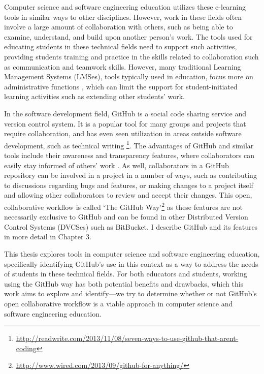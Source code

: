 Computer science and software engineering education utilizes these e-learning tools in similar ways to other disciplines. However, work in these fields often involve a large amount of collaboration with others, such as being able to examine, understand, and build upon another person's work. The tools used for educating students in these technical fields need to support such activities, providing students training and practice in the skills related to collaboration such as communication and teamwork skills. However, many traditional Learning Management Systems (LMSes), tools typically used in education, focus more on administrative functions \cite{mott2010envisioning}, which can limit the support for student-initiated learning activities such as extending other students' work.

In the software development field, GitHub is a social code sharing service and version control system. It is a popular tool for many groups and projects that require collaboration, and has even seen utilization in areas outside software development, such as technical writing \footnote{\url{http://readwrite.com/2013/11/08/seven-ways-to-use-github-that-arent-coding}}. The advantages of GitHub and similar tools include their awareness and transparency features, where collaborators can easily stay informed of others' work \cite{dabbish2012social}. As well, collaborators in a GitHub repository can be involved in a project in a number of ways, such as contributing to discussions regarding bugs and features, or making changes to a project itself and allowing other collaborators to review and accept their changes. This open, collaborative workflow is called `The GitHub Way'\footnote{\url{http://www.wired.com/2013/09/github-for-anything/}} as these features are not necessarily exclusive to GitHub and can be found in other Distributed Version Control Systems (DVCSes) such as BitBucket. I describe GitHub and its features in more detail in Chapter 3.


This thesis explores tools in computer science and software engineering education, specifically identifying GitHub's use in this context as a way to address the needs of students in these technical fields. For both educators and students, working using the GitHub way has both potential benefits and drawbacks, which this work aims to explore and identify---we try to determine whether or not GitHub's open collaborative workflow is a viable approach in computer science and software engineering education.

